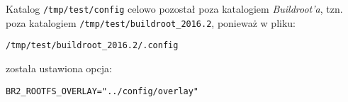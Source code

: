 \documentclass{article}
\begin{document}
Katalog \texttt{/tmp/test/config} celowo pozostał poza katalogiem \emph{Buildroot'a}, tzn. poza katalogiem \texttt{/tmp/test/buildroot\_2016.2}, ponieważ w pliku:
\begin{center}
\texttt{/tmp/test/buildroot\_2016.2/.config}
\end{center}
została ustawiona opcja:
\begin{center}
\texttt{BR2\_ROOTFS\_OVERLAY="../config/overlay"}
\end{center}




\end{document}
